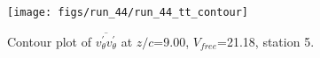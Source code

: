\begin{figure}[H]
\centering
\texttt{[image: figs/run\_44/run\_44\_tt\_contour]}
\caption{Contour plot of $\overline{v_{\theta}^{\prime} v_{\theta}^{\prime}}$ at $z/c$=9.00, $V_{free}$=21.18, station 5.}
\label{fig:run_44_tt_contour}
\end{figure}


